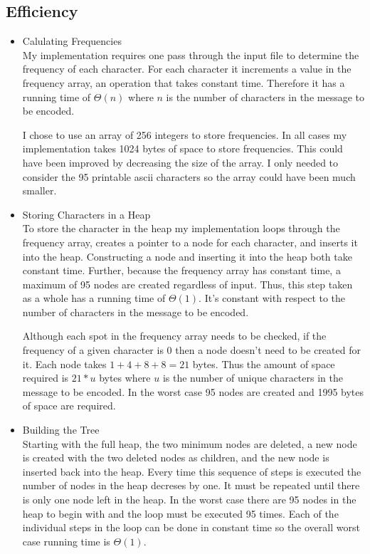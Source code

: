 \documentclass{article}
\begin{document}
\subsection{Efficiency}
\begin{itemize}
    \item Calulating Frequencies\\
        My implementation requires one pass through the input file to determine the frequency of each character. For each character it increments a value in the frequency array, an operation that takes constant time. Therefore it has a running time of $\Theta(n)$ where $n$ is the number of characters in the message to be encoded.

        I chose to use an array of 256 integers to store frequencies. In all cases my implementation takes 1024 bytes of space to store frequencies. This could have been improved by decreasing the size of the array. I only needed to consider the 95 printable ascii characters so the array could have been much smaller.

    \item Storing Characters in a Heap\\
        To store the character in the heap my implementation loops through the frequency array, creates a pointer to a node for each character, and inserts it into the heap. Constructing a node and inserting it into the heap both take constant time. Further, because the frequency array has constant time, a maximum of 95 nodes are created regardless of input. Thus, this step taken as a whole has a running time of $\Theta(1)$. It's constant with respect to the number of characters in the message to be encoded.

Although each spot in the frequency array needs to be checked, if the frequency of a given character is 0 then a node doesn't need to be created for it. Each node takes $1 + 4 + 8 + 8 = 21$ bytes. Thus the amount of space required is $21 * u$ bytes where $u$ is the number of unique characters in the message to be encoded. In the worst case 95 nodes are created and 1995 bytes of space are required.

    \item Building the Tree\\
        Starting with the full heap, the two minimum nodes are deleted, a new node is created with the two deleted nodes as children, and the new node is inserted back into the heap. Every time this sequence of steps is executed the number of nodes in the heap decreses by one. It must be repeated until there is only one node left in the heap. In the worst case there are 95 nodes in the heap to begin with and the loop must be executed 95 times. Each of the individual steps in the loop can be done in constant time so the overall worst case running time is $\Theta(1)$. 


\end{itemize}
\end{document}
